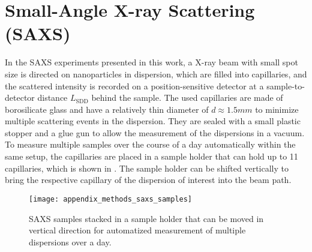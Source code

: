 \documentclass[\main/dresen_thesis.tex]{subfiles}
\begin{document}
  \section{Small-Angle X-ray Scattering (SAXS)}
    \label{ch:methods:saxs}
    In the SAXS experiments presented in this work, a X-ray beam with small spot size is directed on nanoparticles in dispersion, which are filled into capillaries, and the scattered intensity is recorded on a position-sensitive detector at a sample-to-detector distance $L_\mathrm{SDD}$ behind the sample.
    The used capillaries are made of borosilicate glass and have a relatively thin diameter of $d \approx 1.5\unit{mm}$ to minimize multiple scattering events in the dispersion.
    They are sealed with a small plastic stopper and a glue gun to allow the measurement of the dispersions in a vacuum.
    To measure multiple samples over the course of a day automatically within the same setup, the capillaries are placed in a sample holder that can hold up to 11 capillaries, which is shown in .
    The sample holder can be shifted vertically to bring the respective capillary of the dispersion of interest into the beam path.
    \begin{figure}[tb]
      \centering
      \texttt{[image: appendix\_methods\_saxs\_samples]}
      \caption{\label{fig:methods:saxs:samples} SAXS samples stacked in a sample holder that can be moved in vertical direction for automatized measurement of multiple dispersions over a day. }
    \end{figure}
\end{document}
